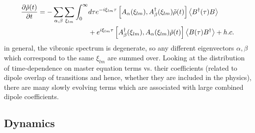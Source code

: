 \documentclass[]{article}
\begin{document}
\begin{align}
	\begin{split}
		\pdv{\tilde{\rho}(t)}{t} = - \sum_{\alpha, \beta}\sum_{\xi_{lm}}\int_{0}^{\infty}& d\tau e^{-i\xi_{lm}\tau} \left[A_{\alpha}(\xi_{lm}), A_{\beta}^{\dagger}(\xi_{lm})\tilde{\rho}(t)\right] \expval{B^{\dagger}(\tau)B} \\
		&+ e^{i \xi_{lm}\tau} \left[A_{\beta}^{\dagger}(\xi_{lm}), A_{\alpha}(\xi_{lm})\tilde{\rho}(t)\right] \expval{B(\tau)B^{\dagger}} + h.c. 
	\end{split}
\end{align}
in general, the vibronic spectrum is degenerate, so any different eigenvectors $\alpha, \beta$ which correspond to the same $\xi_{lm}$ are summed over. Looking at the distribution of time-dependence on master equation terms vs. their coefficients (related to dipole overlap of transitions and hence, whether they are included in the physics), there are many slowly evolving terms which are associated with large combined dipole coefficients.
\begin{comment}
\begin{figure}
	\texttt{[image: "C:/Users/mbcxrhm2/Dropbox/PhD/1st year/TwoSpins/DrivenDimer/EM\_and\_RC/EM\_and\_RC/Images/NonSecularity".png]}
	\caption{Inspecting the validity of the secular approximation in the case of the dimer eigenst. There are many slowly evolving terms with large coefficients.}
	\label{fig:}
\end{figure}
\end{comment}
\subsection{Dynamics}
\end{document}
